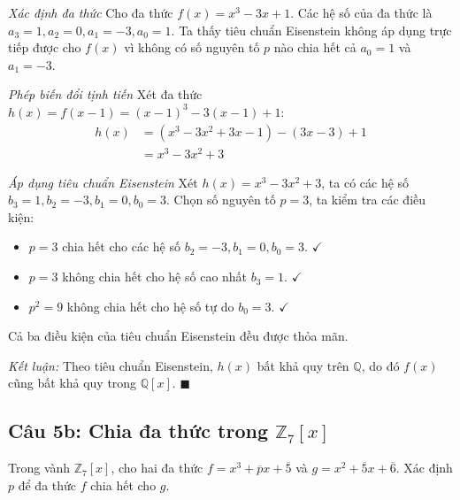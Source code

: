 \begin{solution}
\textit{Xác định đa thức}
Cho đa thức $f(x) = x^3 - 3x + 1$. 
Các hệ số của đa thức là $a_3 = 1, a_2 = 0, a_1 = -3, a_0 = 1$.
Ta thấy tiêu chuẩn Eisenstein không áp dụng trực tiếp được cho $f(x)$ vì không có số nguyên tố $p$ nào chia hết cả $a_0 = 1$ và $a_1 = -3$.

\textit{Phép biến đổi tịnh tiến}
Xét đa thức $h(x) = f(x - 1) = (x - 1)^3 - 3(x - 1) + 1$:
\begin{align*}
    h(x) &= (x^3 - 3x^2 + 3x - 1) - (3x - 3) + 1 \\
    &= x^3 - 3x^2 + 3
\end{align*}

\textit{Áp dụng tiêu chuẩn Eisenstein}
Xét $h(x) = x^3 - 3x^2 + 3$, ta có các hệ số $b_3 = 1, b_2 = -3, b_1 = 0, b_0 = 3$.
Chọn số nguyên tố $p = 3$, ta kiểm tra các điều kiện:
\begin{itemize}
    \item $p = 3$ chia hết cho các hệ số $b_2 = -3, b_1 = 0, b_0 = 3$. $\checkmark$
    \item $p = 3$ không chia hết cho hệ số cao nhất $b_3 = 1$. $\checkmark$
    \item $p^2 = 9$ không chia hết cho hệ số tự do $b_0 = 3$. $\checkmark$
\end{itemize}
Cả ba điều kiện của tiêu chuẩn Eisenstein đều được thỏa mãn.

\textit{Kết luận:} Theo tiêu chuẩn Eisenstein, $h(x)$ bất khả quy trên $\mathbb{Q}$, do đó $f(x)$ cũng bất khả quy trong $\mathbb{Q}[x]$. $\blacksquare$
\end{solution}

\subsection*{Câu 5b: Chia đa thức trong $\mathbb{Z}_7[x]$}

\begin{questionbox}
Trong vành $\mathbb{Z}_7[x]$, cho hai đa thức $f = x^3 + \overline{p}x + \overline{5}$ và $g = x^2 + \overline{5}x + \overline{6}$. Xác định $p$ để đa thức $f$ chia hết cho $g$.
\end{questionbox}

